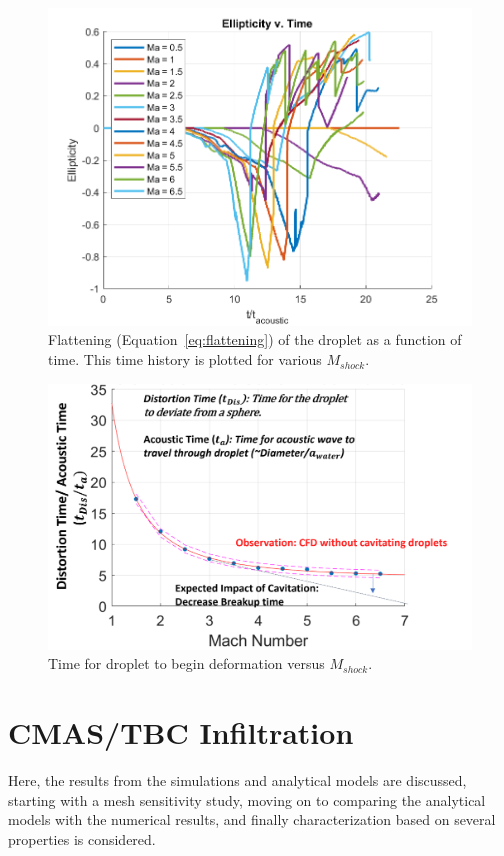 \documentclass{UCF_ETD}
\begin{document}
\begin{figure}
\centering
\includegraphics[width=\textwidth]{Figures/Ellipticity_v_Ma.png}
\caption{Flattening (Equation~\ref{eq:flattening}) of the droplet as a function of time. This time history is plotted for various $M_{shock}$.}
\label{fig:transientFlattening}
\end{figure}

\begin{figure}
\centering
\includegraphics[width=\textwidth]{Figures/Deformation_time_scale_v_Ma.png}
\caption{Time for droplet to begin deformation versus $M_{shock}$.}
\label{fig:def_time_scale}
\end{figure}




\section{CMAS/TBC Infiltration}
Here, the results from the simulations and analytical models are discussed, starting with a mesh sensitivity study, moving on to comparing the analytical models with the numerical results, and finally characterization based on several properties is considered.
\end{document}
